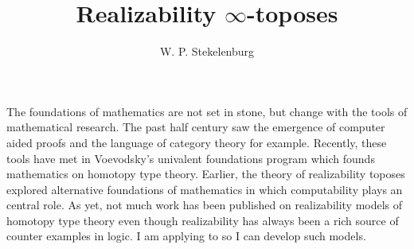 \documentclass[12pt, a4paper]{article}
\title{Realizability $\infty$-toposes}
\author{W. P. Stekelenburg}
\date{}
\theoremstyle{plain}
\theoremstyle{definition}
\newcommand\hide[1]{}
\begin{document}
\maketitle

\hide{
Waar zoek je naar?

- karakterisatie?
- tegenvoorbeelden?


- realizeerbaarheid om een modelcategorie in een model voor homotopy type theory te veranderen:
  van cofibrante PCA naar univalente fibratie.
 
- Ja! door direct naar assemblies te gaan ontlopen we alle problemen. Nou ja, alleen als we met een topos beginnen natuurlijk. Ok.
}


\hide{
1 Large general topic of wide interest
  Iets met computability en logica. iets epistemologisch. misschien iets practisch en toepasbaars
2 Literatures
  Homotopy type theory
  Realizability toposes
3 Gap: realizability models for hott, realizability $\infty$ toposes. 
  Waarom ben ik de aangewezen onderzoeker
4 Researchvraag
5 specifics
  background, location, history, context, limitations???
6 literature review
7 methodology
8 timeline
9 budget
10 conclusion
}


\hide{
Drie dingen bij elkaar brengen: realizeerbaarheid, formele verificatie en homotopy type theory. Kan dat? Waarom moet ik onderzoek doen naar realizeerbaarheidsmodellen van hott?
De vraag is dan: wat maakt hott zelf zo interessant? 

The nature of mathematical truth -- logic and foundations. The nature of mathematical truth in hott

Ik kan het niet. Ik snap niet hoe ik dit moet doen. Ik moet gewoon uitleggen waarom zoeken naar de 

}

The foundations of mathematics are not set in stone, but change with the tools of mathematical research. The past half century saw the emergence of computer aided proofs and the language of category theory for example. Recently, these tools have met in Voevodsky's univalent foundations program which founds mathematics on homotopy type theory. Earlier, the theory of realizability toposes explored alternative foundations of mathematics in which computability plays an central role. As yet, not much work has been published on realizability models of homotopy type theory even though realizability has always been a rich source of counter examples in logic. I am applying to %
so I can develop such models.
\end{document}
